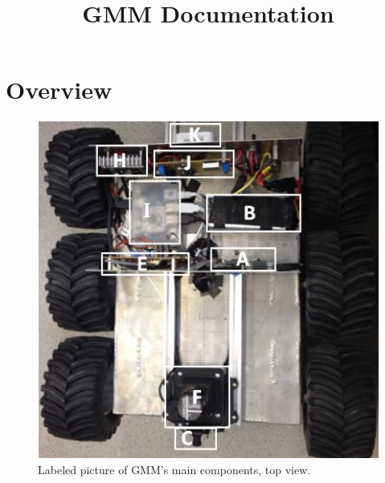 \documentclass[letterpaper,12pt]{report}
\begin{document}
\title{GMM Documentation}
\maketitle

\tableofcontents
\chapter{Overview}

\begin{figure}[h]
	\centering
	\includegraphics[width=1\textwidth]{GMM1.jpg}
	\caption{Labeled picture of GMM's main components, top view.}
	\label{Figure 1:}
\end{figure}
\end{document}
